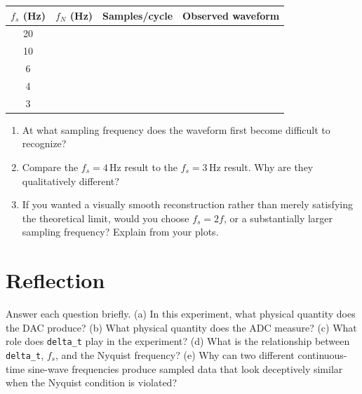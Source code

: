 \documentclass[11pt]{article}
\begin{document}
\begin{center}
\renewcommand{\arraystretch}{1.35}
\begin{tabular}{c c c p{5.0cm}}
\toprule
\textbf{$f_s$ (Hz)} & \textbf{$f_N$ (Hz)} & \textbf{Samples/cycle} & \textbf{Observed waveform} \\
\midrule
20 & & & \\
10 & & & \\
6 & & & \\
4 & & & \\
3 & & & \\
\bottomrule
\end{tabular}
\end{center}

\begin{enumerate}[label=\alph*)]
    \item At what sampling frequency does the waveform first become difficult to recognize?
    \item Compare the $f_s=4\,$Hz result to the $f_s=3\,$Hz result. Why are they qualitatively different?
    \item If you wanted a visually smooth reconstruction rather than merely satisfying the theoretical limit, would you choose $f_s=2f$, or a substantially larger sampling frequency? Explain from your plots.
\end{enumerate}

\section{Reflection}

Answer each question briefly. (a) In this experiment, what physical quantity does the DAC produce? (b) What physical quantity does the ADC measure? (c) What role does \texttt{delta\_t} play in the experiment? (d) What is the relationship between \texttt{delta\_t}, $f_s$, and the Nyquist frequency? (e) Why can two different continuous-time sine-wave frequencies produce sampled data that look deceptively similar when the Nyquist condition is violated?
\end{document}
